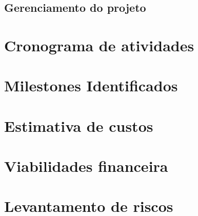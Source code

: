   
  
\subsection{Gerenciamento do projeto} 



\section{Cronograma de atividades}
\section{Milestones Identificados}
\section{Estimativa de custos}
\section{Viabilidades financeira}
\section{Levantamento de riscos}
